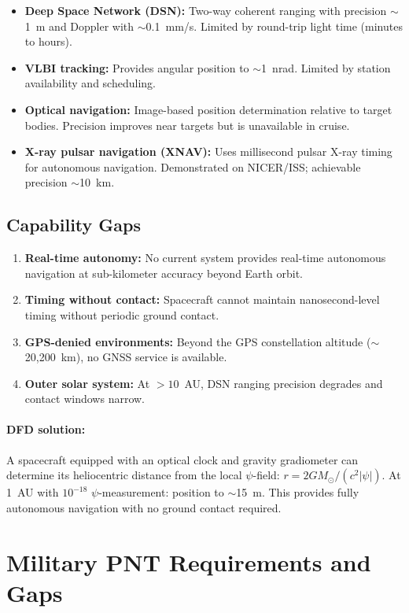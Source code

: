 \documentclass[12pt,letterpaper]{article}
\begin{document}
\begin{itemize}
\item \textbf{Deep Space Network (DSN):} Two-way coherent ranging with
precision $\sim$1~m and Doppler with $\sim$0.1~mm/s. Limited by
round-trip light time (minutes to hours).
\item \textbf{VLBI tracking:} Provides angular position to $\sim$1~nrad.
Limited by station availability and scheduling.
\item \textbf{Optical navigation:} Image-based position determination
relative to target bodies. Precision improves near targets but is
unavailable in cruise.
\item \textbf{X-ray pulsar navigation (XNAV):} Uses millisecond pulsar
X-ray timing for autonomous navigation. Demonstrated on NICER/ISS;
achievable precision $\sim$10~km.
\end{itemize}

\subsection{Capability Gaps}

\begin{enumerate}
\item \textbf{Real-time autonomy:} No current system provides real-time
autonomous navigation at sub-kilometer accuracy beyond Earth orbit.
\item \textbf{Timing without contact:} Spacecraft cannot maintain
nanosecond-level timing without periodic ground contact.
\item \textbf{GPS-denied environments:} Beyond the GPS constellation
altitude ($\sim$20,200~km), no GNSS service is available.
\item \textbf{Outer solar system:} At $> 10$~AU, DSN ranging precision
degrades and contact windows narrow.
\end{enumerate}

\paragraph{DFD solution:}
A spacecraft equipped with an optical clock and gravity gradiometer can
determine its heliocentric distance from the local $\psi$-field:
$r = 2GM_\odot/(c^2|\psi|)$. At 1~AU with $10^{-18}$ $\psi$-measurement:
position to $\sim$15~m. This provides fully autonomous navigation with
no ground contact required.

\section{Military PNT Requirements and Gaps}
\end{document}
